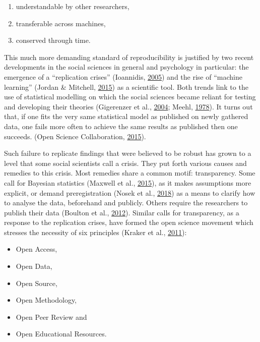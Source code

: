 \documentclass[12pt,a4paper,twoside]{article}
\providecommand{\tightlist}{%
  \setlength{\itemsep}{0pt}\setlength{\parskip}{0pt}}
\begin{document}
\begin{enumerate}
\def\labelenumi{\arabic{enumi}.}
\tightlist
\item
  understandable by other researchers,
\item
  transferable across machines,
\item
  conserved through time.
\end{enumerate}

This much more demanding standard of reproducibility is justified by two recent developments in the social sciences in general and psychology in particular: the emergence of a ``replication crises'' (Ioannidis, \protect\hyperlink{ref-ioannidisWhyMostPublished2005}{2005}) and the rise of ``machine learning'' (Jordan \& Mitchell, \protect\hyperlink{ref-jordanMachineLearningTrends2015}{2015}) as a scientific tool.
Both trends link to the use of statistical modelling on which the social sciences became reliant for testing and developing their theories (Gigerenzer et al., \protect\hyperlink{ref-gigerenzerNullRitualWhat2004}{2004}; Meehl, \protect\hyperlink{ref-meehlTheoreticalRisksTabular1978}{1978}).
It turns out that, if one fits the very same statistical model as published on newly gathered data, one fails more often to achieve the same results as published then one succeeds. (Open Science Collaboration, \protect\hyperlink{ref-opensciencecollaborationEstimatingReproducibilityPsychological2015}{2015}).

Such failure to replicate findings that were believed to be robust has grown to a level that some social scientists call a crisis.
They put forth various causes and remedies to this crisis.
Most remedies share a common motif: transparency.
Some call for Bayesian statistics (Maxwell et al., \protect\hyperlink{ref-maxwellPsychologySufferingReplication2015}{2015}), as it makes assumptions more explicit, or demand preregistration (Nosek et al., \protect\hyperlink{ref-nosekPreregistrationRevolution2018}{2018}) as a means to clarify how to analyse the data, beforehand and publicly. Others require the researchers to publish their data (Boulton et al., \protect\hyperlink{ref-boultonScienceOpenEnterprise2012}{2012}).
Similar calls for transparency, as a response to the replication crises, have formed the open science movement which stresses the necessity of six principles (Kraker et al., \protect\hyperlink{ref-krakerCaseOpenScience2011}{2011}):

\begin{itemize}
\tightlist
\item
  Open Access,
\item
  Open Data,
\item
  Open Source,
\item
  Open Methodology,
\item
  Open Peer Review and
\item
  Open Educational Resources.
\end{itemize}
\end{document}
